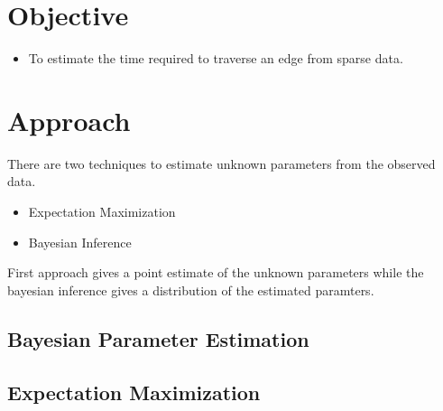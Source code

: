 \documentclass[12pt]{article}
\begin{document}
\section{Objective}
\begin{itemize}
\item To estimate the time required to traverse an edge from sparse data.
\end{itemize}
\section{Approach}
There are two techniques to estimate unknown parameters from the observed data.
\begin{itemize}
\item Expectation Maximization
\item Bayesian Inference
\end{itemize}

First approach gives a point estimate of the unknown parameters while the bayesian inference gives a distribution of the estimated paramters. 
\subsection{Bayesian Parameter Estimation}
\subsection{Expectation Maximization}




\vspace*{6\baselineskip}
\newpage


\end{document}
